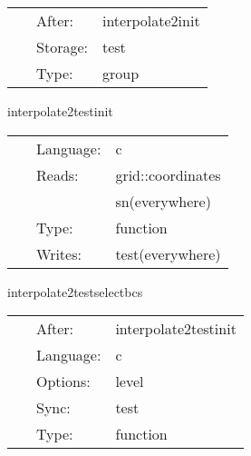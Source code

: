 \documentclass{article}
\begin{document}
\hspace{5mm}{\it test interpolating inter-patch boundaries } 


\hspace{5mm}

 \begin{tabular*}{160mm}{cll} 
~ & After:  & interpolate2init \\ 
~ & Storage:  & test \\ 
~ & Type:  & group \\ 
\end{tabular*} 


\vspace{5mm}


\hspace{5mm} interpolate2testinit 

\hspace{5mm}{\it test: initialise test grid function } 


\hspace{5mm}

 \begin{tabular*}{160mm}{cll} 
~ & Language:  & c \\ 
~ & Reads:  & grid::coordinates \\ 
~& ~ &sn(everywhere)\\ 
~ & Type:  & function \\ 
~ & Writes:  & test(everywhere) \\ 
\end{tabular*} 


\vspace{5mm}


\hspace{5mm} interpolate2testselectbcs 

\hspace{5mm}{\it test: interpolate test grid function } 


\hspace{5mm}

 \begin{tabular*}{160mm}{cll} 
~ & After:  & interpolate2testinit \\ 
~ & Language:  & c \\ 
~ & Options:  & level \\ 
~ & Sync:  & test \\ 
~ & Type:  & function \\ 
\end{tabular*} 
\end{document}
